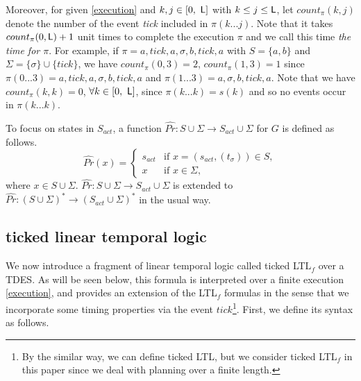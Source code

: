 \documentclass[journal,twoside,web]{IEEEtran}
\newcommand{\req}[1]{\eqref{#1}}
\renewcommand{\Pr}{\widehat{Pr}}
\newcommand{\Len}{{\sf L}}
\begin{document}
Moreover, for given \req{execution} and $k, j\in [0,\ \Len]$ with $k \leq j \leq \Len$, let $count_\pi(k,j)$ denote the number of the event \textit{tick} included in $\pi(k...j)$.
Note that it takes $count_{\pi}(0, {\Len})+1$ unit times to complete the execution $\pi$ and we call this time \textit{the time for $\pi$}.
%
For example, if $\pi=a,\textit{tick},a,\sigma,b,\textit{tick},a$ with $S=\{a,b\}$ and $\Sigma = \{\sigma\}\cup \{\textit{tick}\}$, we have $count_\pi(0,3) = 2$, $count_\pi (1, 3) = 1$ since $\pi(0...3) = a,\textit{tick},a,\sigma,b,\textit{tick},a$ and $\pi(1...3) = a,\sigma,b,\textit{tick},a$. Note that we have $count_\pi(k, k)=0$, $\forall k \in [ 0, \ \Len ]$, since $\pi(k...k) = s(k)$ and so no events occur in $\pi(k...k)$.
%
%

To focus on states in $S_{act}$, a function $\Pr: S \cup \Sigma \to S_{act} \cup \Sigma $ for $G$ is defined as follows.
\label{def:Pr}
\[
\Pr (x )=\left\{
\begin{array}{ll}
s_{act} & \mbox{if }x =(s_{act}, (t_{\sigma})) \in S,  \\ 
x  & \mbox{if } x \in \Sigma , 
\end{array} \right.
\]
where $x  \in S  \cup \Sigma $. 
$\Pr : S \cup \Sigma \to S_{act} \cup \Sigma$ is extended to $\Pr : (S  \cup \Sigma )^* \to  (S_{act} \cup \Sigma )^*$ in the usual way.
%
%
\subsection{ticked linear temporal logic}
We now introduce a fragment of linear temporal logic called ticked LTL$_f$ over a TDES\cite{KHU2020}.
As will be seen below, this formula is interpreted over a finite execution \req{execution}, and provides an extension of the LTL$_f$ formulas\cite{Zhu2017} in the sense that we incorporate some timing properties via the event ${\textit{tick}}$\footnote{By the similar way, we can define ticked LTL, but we consider ticked LTL$_{f}$ in this paper since we deal with planning over a finite length.}.
First, we define its syntax as follows.
\end{document}
